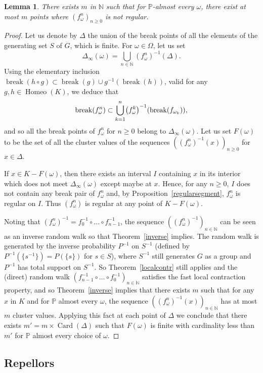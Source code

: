 \documentclass[10pt]{amsart}
\newtheorem{lemm}[theo]{Lemma}\newtheorem{prop}[theo]{Proposition}\newtheorem{coro}[theo]{Corollary}\newtheorem{conj}[theo]{Conjecture}
\theoremstyle{definition}\newtheorem{defi}[theo]{Definition}\newtheorem{rema}[theo]{Remark}\newtheorem{exam}[theo]{Example}\newtheorem{exem}[theo]{Example}\newtheorem{nota}[theo]{Notation}
\DeclareMathOperator{\breaKk}{break}
\DeclareMathOperator{\Homeo}{Homeo}
\DeclareMathOperator{\Card}{Card}
\newcommand{\bbP}{\mathbb{P}}
\newcommand{\N}{\mathbb{N}}
\let\originalleft\left
\let\originalright\right
\renewcommand{\left}{\mathopen{}\mathclose\bgroup\originalleft}
\renewcommand{\right}{\aftergroup\egroup\originalright}
\begin{document}
\begin{lemm}\label{regular}
There exists $m$ in $\N$ such that for $\bbP$-almost every $\omega$, there exist at most $m$ points where $(f_\omega^n)_{n\geq 0}$ is not regular.
\end{lemm}
\begin{proof}
Let us denote by $\Delta$ the union of the break points of all the elements of the generating set $S$ of $G$, which is finite. For $\omega\in \Omega$, let us set
\[
\Delta_{\infty}(\omega)=\bigcup_{n\in\N} (f_\omega^n)^{-1}(\Delta).
\]
Using the elementary inclusion $\breaKk(h \circ g)\subset \breaKk(g)\cup g^{-1}(\breaKk(h))$, valid for any $g,h\in \Homeo(K)$, we deduce that
\[
\breaKk(f_\omega^n) \subset \bigcup_{k=1}^{n} \left(f_\omega^k\right)^{-1}(\breaKk(f_{\omega_k})),
\]
and so all the break points of $f_\omega^n$ for $n\geq 0$ belong to $\Delta_{\infty}(\omega)$. Let us set $F(\omega)$ to be the set of all the cluster values of the sequences $((f_{\omega}^{n})^{-1}(x))_{n \geq 0}$ for $x\in\Delta$.

If $x\in K-F(\omega)$, then there exists an interval $I$ containing $x$ in its interior which does not meet $\Delta_{\infty}(\omega)$ except maybe at $x$. Hence, for any $n\geq 0$, $I$ does not contain any break pair of $f_\omega^n$ and, by Proposition~\ref{regularsegment}, $f_\omega^n$ is regular on $I$. Thus $(f_\omega^n)$ is regular at any point of $K-F(\omega)$.

Noting that $(f_{\omega}^{n})^{-1}=f_0^{-1}\circ\dots\circ f_{n-1}^{-1}$, the sequence $((f_\omega^n)^{-1})_{n\in\N}$ can be seen as an inverse random walk so that Theorem~\ref{inverse} implies. The random walk is generated by the inverse probability $P^{-1}$ on $S^{-1}$ (defined by $P^{-1}(\{s^{-1}\})=P(\{s\})$ for $s\in S$), where $S^{-1}$ still generates $G$ as a group and $P^{-1}$ has total support on $S^{-1}$. So Theorem~\ref{localcontr} still applies and the (direct) random walk $(f_{n-1}^{-1}\circ\dots\circ f_{0}^{-1})_{n\in\N}$ satisfies the fast local contraction property, and so Theorem~\ref{inverse} implies that there exists $m$ such that for any $x$ in $K$ and for $\bbP$ almost every $\omega$, the sequence $((f_\omega^n)^{-1}(x))_{n\in\N}$ has at most $m$ cluster values. Applying this fact at each point of $\Delta$ we conclude that there exists $m'=m\times \Card(\Delta)$ such that $F(\omega)$ is finite with cardinality less than $m'$ for $\bbP$ almost every choice of $\omega$.
\end{proof}


\subsection{Repellors}
\end{document}
